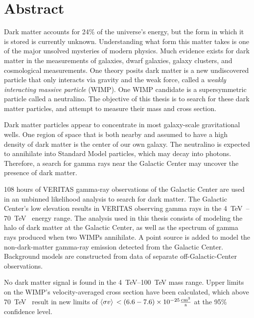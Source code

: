 \cleartooddpage[\thispagestyle{empty}]
\section*{Abstract}

Dark matter accounts for 24\% of the universe's energy, but the form in which it is stored is currently unknown.
Understanding what form this matter takes is one of the major unsolved mysteries of modern physics.
Much evidence exists for dark matter in the measurements of galaxies, dwarf galaxies, galaxy clusters, and cosmological measurements.
One theory posits dark matter is a new undiscovered particle that only interacts via gravity and the weak force, called a \textit{weakly interacting massive particle} (WIMP).
One WIMP candidate is a supersymmetric particle called a neutralino.
The objective of this thesis is to search for these dark matter particles, and attempt to measure their mass and cross section.

Dark matter particles appear to concentrate in most galaxy-scale gravitational wells.
One region of space that is both nearby and assumed to have a high density of dark matter is the center of our own galaxy.
The neutralino is expected to annihilate into Standard Model particles, which may decay into photons.
Therefore, a search for gamma rays near the Galactic Center may uncover the presence of dark matter.

108 hours of VERITAS gamma-ray observations of the Galactic Center are used in an unbinned likelihood analysis to search for dark matter.
The Galactic Center's low elevation results in VERITAS observing gamma rays in the \SIrange{4}{70}{\TeV{}} energy range.
The analysis used in this thesis consists of modeling the halo of dark matter at the Galactic Center, as well as the spectrum of gamma rays produced when two WIMPs annihilate.
A point source is added to model the non-dark-matter gamma-ray emission detected from the Galactic Center.
Background models are constructed from data of separate off-Galactic-Center observations.

No dark matter signal is found in the \SIrange{4}{100}{\TeV} mass range.
Upper limits on the WIMP's velocity-averaged cross section have been calculated, which above \SI{70}{\TeV{}} result in new limits of $\left \langle \sigma v \right \rangle{} < \left ( 6.6-7.6 \right ) \times 10^{-25} \frac{\mathrm{cm}^3}{\mathrm{s}}$ at the 95\% confidence level.




\cleartoevenpage[\thispagestyle{plain}]
\null
